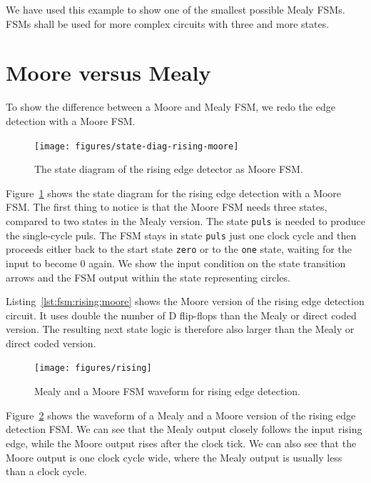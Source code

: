 \documentclass[%
    10pt,
    headinclude, footexclude,
    openright, %
    notitlepage,
    cleardoubleempty,
    headsepline,
    pointlessnumbers,
    bibtotoc, idxtotoc,
    ]{scrbook}
\newcommand{\code}[1]{{\small{\texttt{#1}}}}
\begin{document}
We have used this example to show one of the smallest possible Mealy FSMs.
FSMs shall be used for more complex circuits with three and more states.

\section{Moore versus Mealy}

To show the difference between a Moore and Mealy FSM, we redo the edge
detection with a Moore FSM. 

\begin{figure}
  \centering
  \texttt{[image: figures/state-diag-rising-moore]}
  \caption{The state diagram of the rising edge detector as Moore FSM.}
  \label{fig:diag:rising:moore}
\end{figure}

Figure~\ref{fig:diag:rising:moore} shows the state diagram for the rising
edge detection with a Moore FSM. The first thing to notice is that the Moore FSM
needs three states, compared to two states in the Mealy version.
The state \code{puls} is needed to produce the single-cycle puls.
The FSM stays in state \code{puls} just one clock cycle and then
proceeds either back to the start state \code{zero} or to the \code{one}
state, waiting for the input to become 0 again.
We show the input condition on the state transition arrows and the
FSM output within the state representing circles.


Listing~\ref{lst:fsm:rising:moore} shows the Moore version of the rising edge detection
circuit. It uses double the number of D flip-flops than the Mealy or direct
coded version. The resulting next state logic is therefore also larger
than the Mealy or direct coded version.

\begin{figure}
  \centering
  \texttt{[image: figures/rising]}
  \caption{Mealy and a  Moore FSM waveform for rising edge detection.}
  \label{fig:rising}
\end{figure}

Figure~\ref{fig:rising} shows the waveform of a Mealy and a  Moore version
of the rising edge detection FSM. We can see that the Mealy output closely
follows the input rising edge, while the Moore output rises after the clock tick.
We can also see that the Moore output is one clock cycle wide, where the Mealy
output is usually less than a clock cycle.
\end{document}
